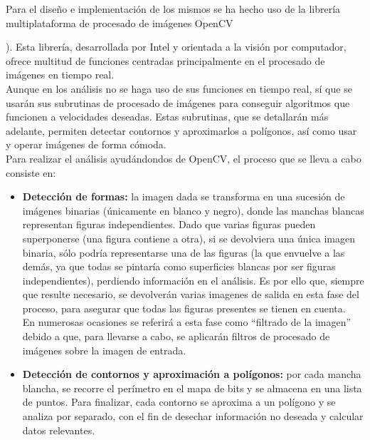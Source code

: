 Para el diseño e implementación de los mismos se ha hecho uso de la librería multiplataforma de procesado de imágenes OpenCV {\cite{opencvDoc}). Esta librería, desarrollada por Intel y orientada a la visión por computador, ofrece multitud de funciones centradas principalmente en el procesado de imágenes en tiempo real.\\

Aunque en los análisis no se haga uso de sus funciones en tiempo real, sí que se usarán sus subrutinas de procesado de imágenes para conseguir algoritmos que funcionen a velocidades deseadas. Estas subrutinas, que se detallarán más adelante, permiten detectar contornos y aproximarlos a polígonos, así como usar y operar imágenes de forma cómoda.\\

Para realizar el análisis ayudándondos de OpenCV, el proceso que se lleva a cabo consiste en:

\begin{itemize}

	\item \textbf{Detección de formas:} la imagen dada se transforma en una sucesión de imágenes binarias (únicamente en blanco y negro), donde las manchas blancas representan figuras independientes. Dado que varias figuras pueden superponerse (una figura contiene a otra), si se devolviera una única imagen binaria, sólo podría representarse una de las figuras (la que envuelve a las demás, ya que todas se pintaría como superficies blancas por ser figuras independientes), perdiendo información en el análisis. Es por ello que, siempre que resulte necesario, se devolverán varias imagenes de salida en esta fase del proceso, para asegurar que todas las figuras presentes se tienen en cuenta.\\
	
	En numerosas ocasiones se referirá a esta fase como ``filtrado de la imagen'' debido a que, para llevarse a cabo, se aplicarán filtros de procesado de imágenes sobre la imagen de entrada.
	
	\item\textbf{Detección de contornos y aproximación a polígonos:} por cada mancha blancha, se recorre el perímetro en el mapa de bits y se almacena en una lista de puntos. Para finalizar, cada contorno se aproxima a un polígono y se analiza por separado, con el fin de desechar información no deseada y calcular datos relevantes. 
	
\end{itemize}

}
